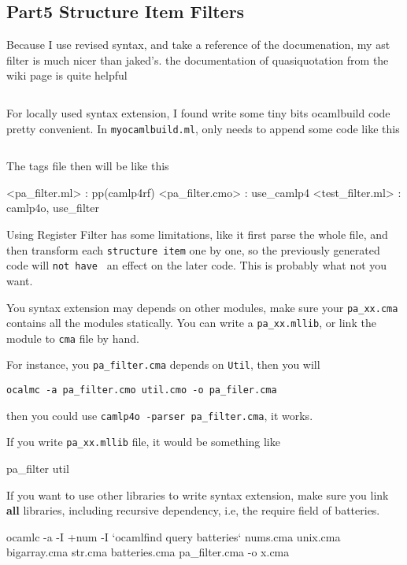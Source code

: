 \subsection{Part5 Structure Item Filters}
Because I use revised syntax, and take a reference of the
documenation, my ast filter is much nicer than jaked's.  the
documentation of quasiquotation from the wiki page is quite helpful

\inputminted[fontsize=\scriptsize, fontsize=\scriptsize, ]{ocaml}{camlp4/code/jake/pa_filter.ml}

For locally used syntax extension, I found write some tiny bits
ocamlbuild code pretty convenient. In \verb|myocamlbuild.ml|, only
needs to append some code like this

\inputminted[fontsize=\scriptsize, fontsize=\scriptsize, firstline=101,lastline=112]{ocaml}{camlp4/code/jake/myocamlbuild.ml}

The tags file then will be like this 
\begin{bluetext}
<pa_filter.{ml}> : pp(camlp4rf)
<pa_filter.{cmo}> : use_camlp4
<test_filter.ml> : camlp4o, use_filter
\end{bluetext}

Using Register Filter has some limitations, like it first parse the
whole file, and then transform each \verb|structure item| one by one,
so the previously generated code will \verb|not have | an effect on
the later code. This is probably what not you want.


You syntax extension may depends on other modules, make sure your
\verb|pa_xx.cma| contains all the modules statically. You can write a
\verb|pa_xx.mllib|, or link the module to \verb|cma| file by hand.

For instance, you \verb|pa_filter.cma| depends on \verb|Util|, then
you will 

\verb|ocalmc -a pa_filter.cmo util.cmo -o pa_filer.cma|

then you could use \verb|camlp4o -parser pa_filter.cma|, it works.

If you write \verb|pa_xx.mllib| file, it would be something like

\begin{bluetext}
pa_filter
util
\end{bluetext}
If you want to use other libraries to write syntax extension, make
sure you link \textbf{all} libraries, including recursive dependency,
i.e, the require field of batteries.
\begin{bluetext}
ocamlc -a  -I +num -I `ocamlfind query batteries` nums.cma unix.cma
bigarray.cma str.cma batteries.cma pa_filter.cma -o x.cma
\end{bluetext}


